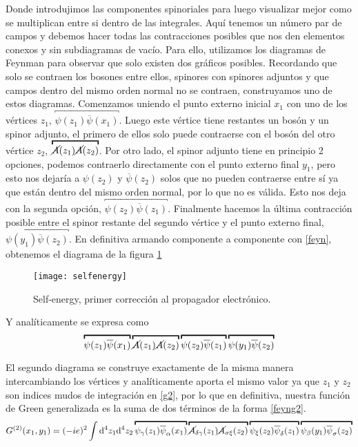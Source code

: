 \documentclass[tickz]{article}
\numberwithin{equation}{section}
\begin{document}
Donde introdujimos las componentes spinoriales para luego visualizar mejor como se multiplican entre si dentro de las integrales. Aquí tenemos un número par de campos y debemos hacer todas las
contracciones posibles que nos den elementos conexos y sin subdiagramas
de vacío. Para ello, utilizamos los diagramas de Feynman para observar
que solo existen dos gráficos posibles. Recordando que solo se contraen
los bosones entre ellos, spinores con spinores adjuntos y que campos
dentro del mismo orden normal no se contraen, construyamos uno de
estos diagramas. Comenzamos uniendo el punto externo inicial $x_{1}$
con uno de los vértices $z_{1}$, $\overbracket{\psi(z_{1})\overline{\psi}(x_{1})}$.
Luego este vértice tiene restantes un bosón y un spinor adjunto, el
primero de ellos solo puede contraerse con el bosón del otro vértice
$z_{2}$, $\overbracket{\cancel{A}(z_{1})\cancel{A}(z_{2})}$. Por otro lado, el
spinor adjunto tiene en principio 2 opciones, podemos contraerlo directamente
con el punto externo final $y_{1}$, pero esto nos dejaría a $\psi(z_{2})$
y $\overline{\psi}(z_{2})$ solos que no pueden contraerse entre sí
ya que están dentro del mismo orden normal, por lo que no es válida.
Esto nos deja con la segunda opción, $\overbracket{\psi(z_{2})\overline{\psi}(z_{1})}$.
Finalmente hacemos la última contracción posible entre el spinor restante
del segundo vértice y el punto externo final, $\overbracket{\psi(y_{1})\overline{\psi}(z_{2})}$.
En definitiva armando componente a componente con \ref{feyn}, obtenemos
el diagrama de la figura \ref{fig_self-energy}


\begin{figure}[h]
	\centering
	\texttt{[image: selfenergy]}
	\caption{Self-energy, primer corrección al propagador electrónico.}
	\label{fig_self-energy}
\end{figure}

Y analíticamente se expresa como 
\begin{equation}\label{feyng2}
\overbracket{\psi(z_{1})\overline{\psi}(x_{1})}\overbracket{\cancel{A}(z_{1})\cancel{A}(z_{2})}\overbracket{\psi(z_{2})\overline{\psi}(z_{1})}\overbracket{\psi(y_{1})\overline{\psi}(z_{2})}
\end{equation}

El segundo diagrama se construye exactamente de la misma manera intercambiando
los vértices y analíticamente aporta el mismo valor ya que $ z_1 $ y $ z_2 $ son indices mudos de integración en \ref{g2}, por lo que en
definitiva, nuestra función de Green generalizada es la suma de dos
términos de la forma \ref{feyng2}.
\begin{equation}
G^{(2)}(x_{1},y_{1})=(-ie)^{2}\int \mathrm{d^4}z_{1}\mathrm{d^4}z_{2}\overbracket{\psi_{\gamma}(z_{1})\overline{\psi}_{\alpha}(x_{1})}\overbracket{\cancel{A}_{\delta\gamma}(z_{1})\cancel{A}_{\sigma\xi}(z_{2})}\overbracket{\psi_{\xi}(z_{2})\overline{\psi}_{\delta}(z_{1})}\overbracket{\psi_{\beta}(y_{1})\overline{\psi}_{\sigma}(z_{2})}
\end{equation}
\end{document}

